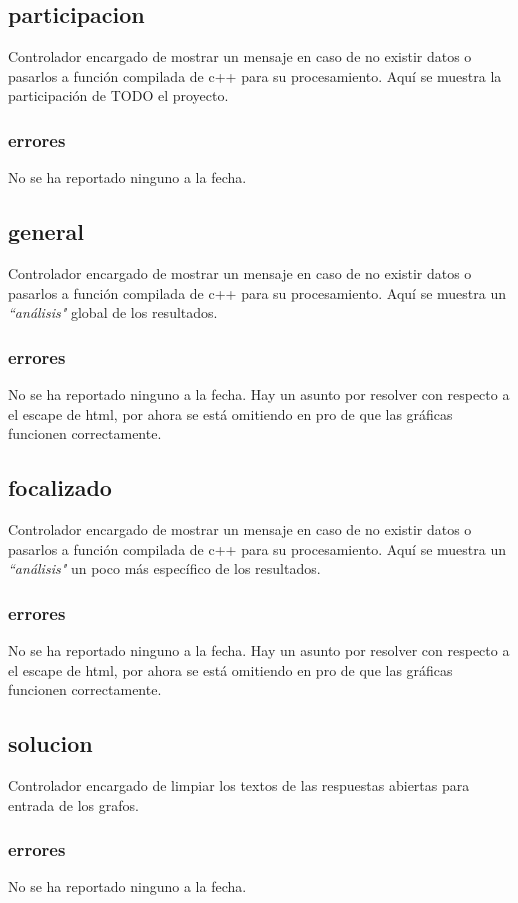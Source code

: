 \documentclass[10pt,a4paper]{book}
\begin{document}
	\subsection{participacion}
	Controlador encargado de mostrar un mensaje en caso de no existir datos o pasarlos a función compilada de c++ para su procesamiento. Aquí se muestra la participación de TODO el proyecto.
	\subsubsection{errores}
	No se ha reportado ninguno a la fecha.
	
	\subsection{general}
	Controlador encargado de mostrar un mensaje en caso de no existir datos o pasarlos a función compilada de c++ para su procesamiento. Aquí se muestra un \textit{``análisis"} global de los resultados.
	\subsubsection{errores}
	No se ha reportado ninguno a la fecha. Hay un asunto por resolver con respecto a el escape de html, por ahora se está omitiendo en pro de que las gráficas funcionen correctamente. 
	
	\subsection{focalizado}
	Controlador encargado de mostrar un mensaje en caso de no existir datos o pasarlos a función compilada de c++ para su procesamiento. Aquí se muestra un \textit{``análisis"} un poco más específico de los resultados.
	\subsubsection{errores}
	No se ha reportado ninguno a la fecha. Hay un asunto por resolver con respecto a el escape de html, por ahora se está omitiendo en pro de que las gráficas funcionen correctamente. 
	
	\subsection{solucion}
	Controlador encargado de limpiar los textos de las respuestas abiertas para entrada de los grafos.
	\subsubsection{errores}
	No se ha reportado ninguno a la fecha.
	
\end{document}
